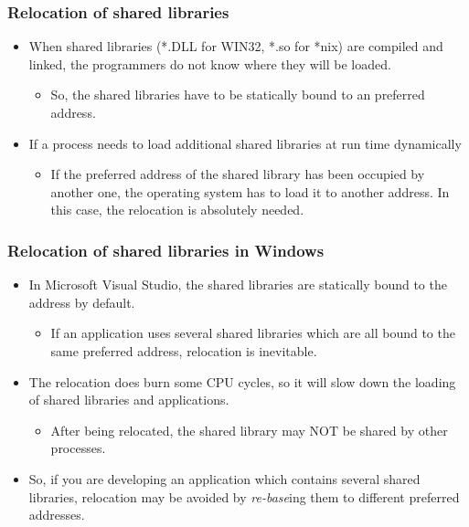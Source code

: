 \documentclass[CJKutf8,xcolor=pdftex,dvipsnames,table]{beamer}
\begin{document}
\begin{CJK*}{UTF8}{song}
  \begin{frame}
    \frametitle{Relocation of shared libraries} \pause
    \begin{itemize}
    \item{When shared libraries (*.DLL for WIN32, *.so for *nix) are compiled and linked, the programmers do not know where they will be loaded.} \pause
      \begin{itemize}
      \item{So, the shared libraries have to be statically bound to an preferred address.} \pause
      \end{itemize}
    \item{If a process needs to load additional shared libraries at run time dynamically} \pause
      \begin{itemize}
      \item{If the preferred address of the shared library has been occupied by another one, the operating system has to load it to another address. In this case, the relocation is absolutely needed.}
      \end{itemize}
    \end{itemize}
  \end{frame}

  
  \begin{frame}
    \frametitle{Relocation of shared libraries in Windows} \pause
    \begin{itemize}
    \item{In Microsoft Visual Studio, the shared libraries are statically bound to the address  by default.} \pause
      \begin{itemize}
      \item{If an application uses several shared libraries which are all bound to the same preferred address, relocation is inevitable.} \pause
      \end{itemize}
    \item{The relocation does burn some CPU cycles, so it will slow down the loading of shared libraries and applications.} \pause
      \begin{itemize}
      \item{After being relocated, the shared library may NOT be shared by other processes.} \pause
      \end{itemize}
    \item{So, if you are developing an application which contains several shared libraries, relocation may be avoided by \emph{re-base}ing them to different preferred addresses.}
    \end{itemize}
  \end{frame}
  

\end{CJK*}
\end{document}
